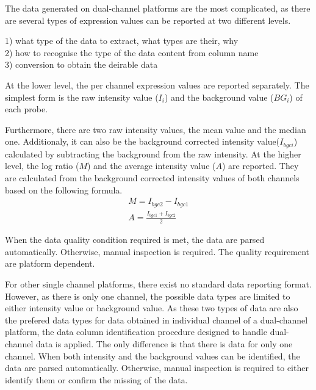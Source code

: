 %
The data generated on dual-channel platforms are the most complicated,
as there are several types of expression values can be reported at two
different levels.

1) what type of the data to extract, what types are their, why \\
2) how to recognise the type of the data content from column name \\
3) conversion to obtain the deirable data


At the lower level, the per channel expression values are reported separately.
%
The simplest form is the raw intensity value ($I_i$) and the background value
($BG_i$) of each probe.

Furthermore, there are two raw intensity values, the mean value and the median
one.
%
Additionaly, it can also be the background corrected intensity
value($I_{bgci}$) calculated by subtracting the background from the raw
intensity.
%
At the higher level, the log ratio ($M$) and the average intensity value ($A$)
are reported.  They are calculated from the background corrected intensity
values of both channels based on the following formula.
%
\begin{eqnarray}
M = I_{bgc2} - I_{bgc1} \\
A = \frac{I_{bgc1} + I_{bgc2}}{2}
\end{eqnarray}

When the data quality condition required is met, the data are parsed
automatically. Otherwise, manual inspection is required.
%
The quality requirement are platform dependent.  


%
%
For other single channel platforms, there exist no standard data reporting
format.  However, as there is only one channel, the possible data types are
limited to either intensity value or background value.
%
As these two types of data are also the prefered data types for data obtained
in individual channel of a dual-channel platform, the data column
identification procedure designed to handle dual-channel data is applied.
%
The only difference is that there is data for only one channel.  
%
When both intensity and the background values can be identified, the data are
parsed automatically.  Otherwise, manual inspection is required to either
identify them or confirm the missing of the data.
%








